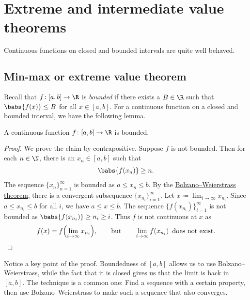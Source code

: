 \section{Extreme and intermediate value theorems}
\label{sec:minmaxint}



Continuous functions on closed and bounded intervals
are quite well behaved.

\subsection{Min-max or extreme value theorem}

Recall that $f \colon [a,b] \to \R$ is
\emph{bounded}
if there exists a $B \in \R$ such that
$\babs{f(x)} \leq B$ for all $x \in [a,b]$.
For a continuous function on a closed and bounded interval, we have the following lemma.

\begin{lemma}
A continuous function $f \colon [a,b] \to \R$ is bounded.
\end{lemma}

\begin{proof}
We prove the claim by contrapositive.  Suppose $f$ is not bounded.
Then for each
$n \in \N$, there is an $x_n \in [a,b]$ such that
\begin{equation*}
\babs{f(x_n)} \geq n .
\end{equation*}
The sequence $\{ x_n \}_{n=1}^\infty$ is bounded as $a \leq x_n \leq b$.
By the \hyperref[thm:bwseq]{Bolzano--Weierstrass theorem},
there is a convergent subsequence $\{ x_{n_i} \}_{i=1}^\infty$.
Let $x \coloneqq \lim_{i\to\infty} x_{n_i}$.
Since $a \leq x_{n_i} \leq b$ for all $i$, we have $a \leq x \leq b$.
The sequence $\bigl\{ f(x_{n_i}) \bigr\}_{i=1}^\infty$ is not bounded 
as 
$\babs{f(x_{n_i})} \geq n_i \geq i$.
Thus $f$ is not continuous at $x$ as
\begin{equation*}
f(x)
=
f\Bigl( \lim_{i\to\infty} x_{n_i} \Bigr) ,
\qquad \text{but} \qquad
\lim_{i\to\infty} f(x_{n_i}) \enspace \text{does not exist.} \qedhere
\end{equation*}
\end{proof}

Notice a key point of the proof.
Boundedness of $[a,b]$ allows us to use Bolzano--Weierstrass,
while the fact that it is closed gives us that the limit is back in $[a,b]$.
The technique is a common one: Find a sequence with a certain property,
then use Bolzano--Weierstrass to make such a sequence that also converges.

